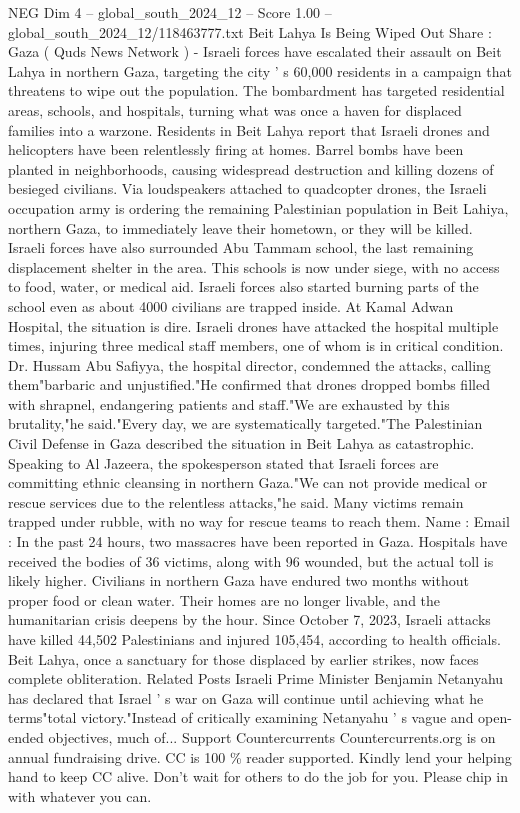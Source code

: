 \begin{textsample}{NEG Dim 4 – global\_south\_2024\_12 – Score 1.00 – global\_south\_2024\_12/118463777.txt}  \label{ex:f4_neg_208}
Beit Lahya Is Being Wiped Out Share : Gaza ( Quds News Network ) - Israeli forces have escalated their assault on Beit Lahya in northern Gaza, targeting the city ' s 60,000 residents in a campaign that threatens to wipe out the population.
The bombardment has targeted residential areas, schools, and hospitals, turning what was once a haven for displaced families into a warzone.
Residents in Beit Lahya report that Israeli drones and helicopters have been relentlessly firing at homes.
Barrel bombs have been planted in neighborhoods, causing widespread destruction and killing dozens of besieged civilians.
Via loudspeakers attached to quadcopter drones, the Israeli occupation army is ordering the remaining Palestinian population in Beit Lahiya, northern Gaza, to immediately leave their hometown, or they will be killed.
Israeli forces have also surrounded Abu Tammam school, the last remaining displacement shelter in the area.
This schools is now under siege, with no access to food, water, or medical aid.
Israeli forces also started burning parts of the school even as about 4000 civilians are trapped inside.
At Kamal Adwan Hospital, the situation is dire.
Israeli drones have attacked the hospital multiple times, injuring three medical staff members, one of whom is in critical condition.
Dr.
Hussam Abu Safiyya, the hospital director, condemned the attacks, calling them"barbaric and unjustified."He confirmed that drones dropped bombs filled with shrapnel, endangering patients and staff."We are exhausted by this brutality,"he said."Every day, we are systematically targeted."The Palestinian Civil Defense in Gaza described the situation in Beit Lahya as catastrophic.
Speaking to Al Jazeera, the spokesperson stated that Israeli forces are committing ethnic cleansing in northern Gaza."We can not provide medical or rescue services due to the relentless attacks,"he said.
Many victims remain trapped under rubble, with no way for rescue teams to reach them.
Name : Email : In the past 24 hours, two massacres have been reported in Gaza.
Hospitals have received the bodies of 36 victims, along with 96 wounded, but the actual toll is likely higher.
Civilians in northern Gaza have endured two months without proper food or clean water.
Their homes are no longer livable, and the humanitarian crisis deepens by the hour.
Since October 7, 2023, Israeli attacks have killed 44,502 Palestinians and injured 105,454, according to health officials.
Beit Lahya, once a sanctuary for those displaced by earlier strikes, now faces complete obliteration.
Related Posts Israeli Prime Minister Benjamin Netanyahu has declared that Israel ' s war on Gaza will continue until achieving what he terms"total victory."Instead of critically examining Netanyahu ' s vague and open-ended objectives, much of...
Support Countercurrents Countercurrents.org is on annual fundraising drive.
CC is 100 \% reader supported.
Kindly lend your helping hand to keep CC alive.
Don't wait for others to do the job for you.
Please chip in with whatever you can.

\end{textsample}
